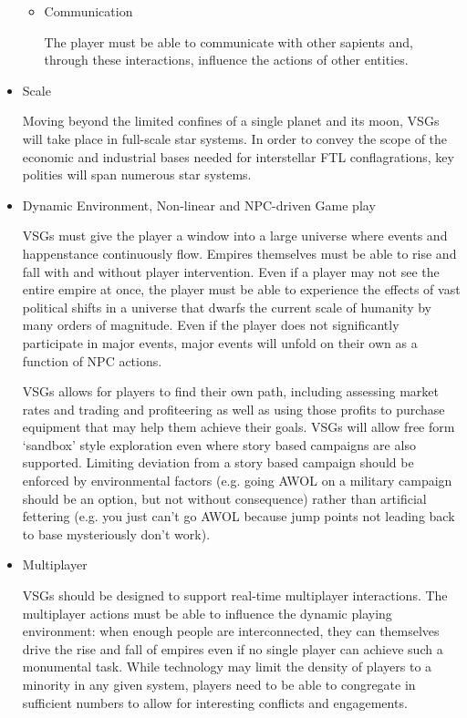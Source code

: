 \begin{itemize}
\begin{itemize}
\item Communication

The player must be able to communicate with other sapients and,
through these interactions, influence the actions of other entities.

\end{itemize}

\item Scale

Moving beyond the limited confines of a single planet and its moon,
VSGs will take place in full-scale star systems. In order to convey the scope of the economic and industrial bases needed for interstellar FTL conflagrations, key polities will span numerous star systems.

\item Dynamic Environment, Non-linear and NPC-driven Game play

VSGs must give the player a window into a large universe where events
and happenstance continuously flow. Empires themselves must be able to
rise and fall with and without player intervention. Even if a player may not see the entire empire at
once, the player must be able to experience the effects of vast
political shifts in a universe that dwarfs the current scale of
humanity by many orders of magnitude. Even if the player does not
significantly participate in major events, major events will unfold on
their own as a function of NPC actions.

VSGs allows for players to find their own path, including assessing
market rates and trading and profiteering as well as using those
profits to purchase equipment that may help them achieve their
goals. VSGs will allow free form `sandbox' style exploration even
where story based campaigns are also supported. Limiting deviation
from a story based campaign should be enforced by environmental
factors (e.g. going AWOL on a military campaign should be an option,
but not without consequence) rather than artificial fettering
(e.g. you just can't go AWOL because jump points not leading back to
base mysteriously don't work).


\item Multiplayer

VSGs should be designed to support real-time multiplayer
interactions. The multiplayer actions must be able to influence the
dynamic playing environment: when enough people are interconnected, they can
themselves drive the rise and fall of empires even if no single player
can achieve such a monumental task. While technology may limit the
density of players to a minority in any given system, players need to
be able to congregate in sufficient numbers to allow for interesting
conflicts and engagements.


\end{itemize}
